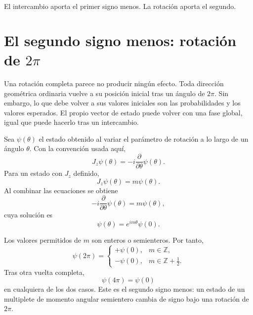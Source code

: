 El intercambio aporta el primer signo menos. La rotación aporta el segundo.

\section{El segundo signo menos: rotación de \texorpdfstring{\(2\pi\)}{2 pi}}

Una rotación completa parece no producir ningún efecto. Toda dirección geométrica ordinaria vuelve a su posición inicial tras un ángulo de \(2\pi\). Sin embargo, lo que debe volver a sus valores iniciales son las probabilidades y los valores esperados. El propio vector de estado puede volver con una fase global, igual que puede hacerlo tras un intercambio.

\begin{classroomqa}
\end{classroomqa}


Sea \(\psi(\theta)\) el estado obtenido al variar el parámetro de rotación a lo largo de un ángulo \(\theta\). Con la convención usada aquí,
\begin{equation}
J_z\psi(\theta)
=
-i\frac{\partial}{\partial\theta}\psi(\theta).
\end{equation}
Para un estado con \(J_z\) definido,
\begin{equation}
J_z\psi(\theta)=m\psi(\theta).
\end{equation}
Al combinar las ecuaciones se obtiene
\begin{equation}
-i\frac{\partial}{\partial\theta}\psi(\theta)
=
m\psi(\theta),
\end{equation}
cuya solución es
\begin{equation}
\psi(\theta)=e^{im\theta}\psi(0).
\end{equation}

Los valores permitidos de \(m\) son enteros o semienteros. Por tanto,
\begin{equation}
\psi(2\pi)
=
\begin{cases}
+\psi(0), & m\in\mathbb Z,\\[4pt]
-\psi(0), & m\in\mathbb Z+\tfrac12.
\end{cases}
\end{equation}
Tras otra vuelta completa,
\begin{equation}
\psi(4\pi)=\psi(0)
\end{equation}
en cualquiera de los dos casos. Este es el segundo signo menos: un estado de un multiplete de momento angular semientero cambia de signo bajo una rotación de \(2\pi\).

